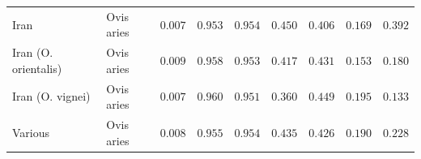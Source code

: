 \documentclass{article}
\providecommand{\DIFaddtex}[1]{{\protect\color{blue}\uwave{#1}}} %
\providecommand{\DIFdeltex}[1]{{\protect\color{red}\sout{#1}}}                      %
\providecommand{\DIFaddFL}[1]{\DIFadd{#1}} %
\providecommand{\DIFdelFL}[1]{\DIFdel{#1}} %
\providecommand{\DIFaddbeginFL}{} %
\providecommand{\DIFaddendFL}{} %
\providecommand{\DIFdelbeginFL}{} %
\providecommand{\DIFdelendFL}{} %
\providecommand{\DIFadd}[1]{\texorpdfstring{\DIFaddtex{#1}}{#1}} %
\providecommand{\DIFdel}[1]{\texorpdfstring{\DIFdeltex{#1}}{}} %
\newcommand{\DIFscaledelfig}{0.5}
\newlength{\DIFdelgraphicswidth} %
\newlength{\DIFdelgraphicsheight} %
\newcommand{\DIFaddincludegraphics}[2][]{{\color{blue}\fbox{\DIFOincludegraphics[#1]{#2}}}} %
\newcommand{\DIFdelincludegraphics}[2][]{%
\sbox{\DIFdelgraphicsbox}{\DIFOincludegraphics[#1]{#2}}%
\settoboxwidth{\DIFdelgraphicswidth}{\DIFdelgraphicsbox} %
\settoboxtotalheight{\DIFdelgraphicsheight}{\DIFdelgraphicsbox} %
\scalebox{\DIFscaledelfig}{%
\parbox[b]{\DIFdelgraphicswidth}{\usebox{\DIFdelgraphicsbox}\\[-\baselineskip] \rule{\DIFdelgraphicswidth}{0em}}\llap{\resizebox{\DIFdelgraphicswidth}{\DIFdelgraphicsheight}{%
\setlength{\unitlength}{\DIFdelgraphicswidth}%
\begin{picture}(1,1)%
\thicklines\linethickness{2pt} %
{\color[rgb]{1,0,0}\put(0,0){\framebox(1,1){}}}%
{\color[rgb]{1,0,0}\put(0,0){\line( 1,1){1}}}%
{\color[rgb]{1,0,0}\put(0,1){\line(1,-1){1}}}%
\end{picture}%
}\hspace*{3pt}}} %
} %
\DeclareRobustCommand{\DIFaddbeginFL}{\DIFOaddbeginFL \let\includegraphics\DIFaddincludegraphics} %
\DeclareRobustCommand{\DIFaddendFL}{\DIFOaddendFL \let\includegraphics\DIFOincludegraphics} %
\DeclareRobustCommand{\DIFdelbeginFL}{\DIFOdelbeginFL \let\includegraphics\DIFdelincludegraphics} %
\DeclareRobustCommand{\DIFdelendFL}{\DIFOaddendFL \let\includegraphics\DIFOincludegraphics} %
\begin{document}
\begin{table}[tb]
\begin{adjustbox}{width=\textwidth}
\begin{tabular}{||l|l|r||r|r||r|r||r|r||}
                Iran & Ovis aries & \DIFdelbeginFL \DIFdelFL{$ 0.007$ }\DIFdelendFL \DIFaddbeginFL \DIFaddFL{$3.8\times 10^{5}$ }\DIFaddendFL & \DIFdelbeginFL \DIFdelFL{$ 0.953$ }\DIFdelendFL \DIFaddbeginFL \DIFaddFL{$ 0.961$ }\DIFaddendFL & \DIFdelbeginFL \DIFdelFL{$ 0.954$ }\DIFdelendFL \DIFaddbeginFL \DIFaddFL{$ 0.961$ }\DIFaddendFL & \DIFdelbeginFL \DIFdelFL{$ 0.450$ }\DIFdelendFL \DIFaddbeginFL \DIFaddFL{$ 0.452$ }\DIFaddendFL & \DIFdelbeginFL \DIFdelFL{$ 0.406$ }\DIFdelendFL \DIFaddbeginFL \DIFaddFL{$ 0.415$ }\DIFaddendFL & \DIFdelbeginFL \DIFdelFL{$ 0.169$ }\DIFdelendFL \DIFaddbeginFL \DIFaddFL{$ 0.205$ }\DIFaddendFL & \DIFdelbeginFL \DIFdelFL{$ 0.392$ }\DIFdelendFL \DIFaddbeginFL \DIFaddFL{$ 0.407$ }\DIFaddendFL \\
                Iran (O. orientalis) & Ovis aries & \DIFdelbeginFL \DIFdelFL{$ 0.009$ }\DIFdelendFL \DIFaddbeginFL \DIFaddFL{$4.5\times 10^{5}$ }\DIFaddendFL & \DIFdelbeginFL \DIFdelFL{$ 0.958$ }\DIFdelendFL \DIFaddbeginFL \DIFaddFL{$ 0.964$ }\DIFaddendFL & \DIFdelbeginFL \DIFdelFL{$ 0.953$ }\DIFdelendFL \DIFaddbeginFL \DIFaddFL{$ 0.960$ }\DIFaddendFL & \DIFdelbeginFL \DIFdelFL{$ 0.417$ }\DIFdelendFL \DIFaddbeginFL \DIFaddFL{$ 0.420$ }\DIFaddendFL & \DIFdelbeginFL \DIFdelFL{$ 0.431$ }\DIFdelendFL \DIFaddbeginFL \DIFaddFL{$ 0.445$ }\DIFaddendFL & \DIFdelbeginFL \DIFdelFL{$ 0.153$ }\DIFdelendFL \DIFaddbeginFL \DIFaddFL{$ 0.193$ }\DIFaddendFL & \DIFdelbeginFL \DIFdelFL{$ 0.180$ }\DIFdelendFL \DIFaddbeginFL \DIFaddFL{$ 0.190$ }\DIFaddendFL \\
                Iran (O. vignei) & Ovis aries & \DIFdelbeginFL \DIFdelFL{$ 0.007$ }\DIFdelendFL \DIFaddbeginFL \DIFaddFL{$3.7\times 10^{5}$ }\DIFaddendFL & \DIFdelbeginFL \DIFdelFL{$ 0.960$ }\DIFdelendFL \DIFaddbeginFL \DIFaddFL{$ 0.967$ }\DIFaddendFL & \DIFdelbeginFL \DIFdelFL{$ 0.951$ }\DIFdelendFL \DIFaddbeginFL \DIFaddFL{$ 0.959$ }\DIFaddendFL & \DIFdelbeginFL \DIFdelFL{$ 0.360$ }\DIFdelendFL \DIFaddbeginFL \DIFaddFL{$ 0.361$ }\DIFaddendFL & \DIFdelbeginFL \DIFdelFL{$ 0.449$ }\DIFdelendFL \DIFaddbeginFL \DIFaddFL{$ 0.470$ }\DIFaddendFL & \DIFdelbeginFL \DIFdelFL{$ 0.195$ }\DIFdelendFL \DIFaddbeginFL \DIFaddFL{$ 0.190$ }\DIFaddendFL & \DIFdelbeginFL \DIFdelFL{$ 0.133$ }\DIFdelendFL \DIFaddbeginFL \DIFaddFL{$ 0.110$ }\DIFaddendFL \\
                Various & Ovis aries & \DIFdelbeginFL \DIFdelFL{$ 0.008$ }\DIFdelendFL \DIFaddbeginFL \DIFaddFL{$4.1\times 10^{5}$ }\DIFaddendFL & \DIFdelbeginFL \DIFdelFL{$ 0.955$ }\DIFdelendFL \DIFaddbeginFL \DIFaddFL{$ 0.962$ }\DIFaddendFL & \DIFdelbeginFL \DIFdelFL{$ 0.954$ }\DIFdelendFL \DIFaddbeginFL \DIFaddFL{$ 0.962$ }\DIFaddendFL & \DIFdelbeginFL \DIFdelFL{$ 0.435$ }\DIFdelendFL \DIFaddbeginFL \DIFaddFL{$ 0.433$ }\DIFaddendFL & \DIFdelbeginFL \DIFdelFL{$ 0.426$ }\DIFdelendFL \DIFaddbeginFL \DIFaddFL{$ 0.440$ }\DIFaddendFL & \DIFdelbeginFL \DIFdelFL{$ 0.190$ }\DIFdelendFL \DIFaddbeginFL \DIFaddFL{$ 0.229$ }\DIFaddendFL & \DIFdelbeginFL \DIFdelFL{$ 0.228$ }\DIFdelendFL \DIFaddbeginFL \DIFaddFL{$ 0.222$ }\DIFaddendFL \\

\end{tabular}
\end{adjustbox}
\end{table}
\end{document}
